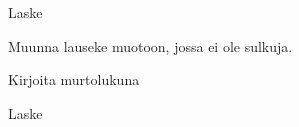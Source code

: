 \begin{tehtavasivu}
\begin{tehtava}
  		Laske
        \begin{vastaus}
        \end{vastaus}
\end{tehtava}

        \begin{tehtava}
    Muunna lauseke muotoon, jossa ei ole sulkuja.
        \begin{vastaus}
        \end{vastaus}
    \end{tehtava}

        \begin{tehtava}
  		Kirjoita murtolukuna
       \begin{vastaus}
        \end{vastaus}
    \end{tehtava}

   \begin{tehtava}
        Laske

        \begin{vastaus}
        \end{vastaus}
    \end{tehtava}
    
    \begin{tehtava}
        \begin{vastaus}
        \end{vastaus}
    \end{tehtava}


\end{tehtavasivu}
